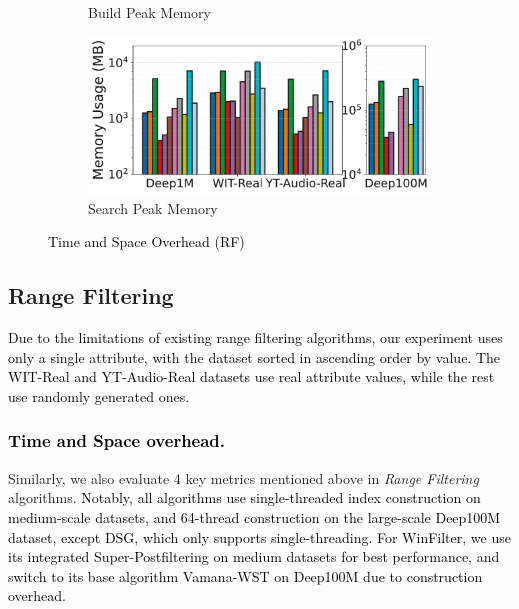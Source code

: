 \documentclass[sigconf, nonacm, pdfa]{acmart}
\begin{document}
{\begin{figure}[t]
\begin{subfigure}[t]{0.495\columnwidth}
			\caption{\footnotesize Build Peak Memory}
			\label{fig:rangeFilter_build_memory_mb}
		\end{subfigure}
		\hfill
		\begin{subfigure}[t]{0.495\columnwidth}
			\centering
			\includegraphics[width=\linewidth]{figures/searchMem/range_memory_comparison.pdf}
			\caption{\footnotesize Search Peak Memory}
			\label{fig:rangeFilter_search_memory_mb}
		\end{subfigure}
		
		\setlength{\abovecaptionskip}{0.1cm}
		\setlength{\belowcaptionskip}{-0.3cm}
		\caption{\textcolor{black}{Time and Space Overhead (RF)}}
		\label{fig:rangeFilter_build_index_comparison}
	\end{figure}
	\subsection{Range Filtering}
	\textcolor{black}{Due to the limitations of existing range filtering algorithms, our experiment uses only a single attribute, with the dataset sorted in ascending order by value. The WIT-Real and YT-Audio-Real datasets use real attribute values, while the rest use randomly generated ones. }
	\subsubsection{\textcolor{black}{Time and Space overhead.}}
	
	Similarly, we also evaluate \textcolor{black}{4} key metrics mentioned above in \textit{Range Filtering} algorithms. \textcolor{black}{Notably, all algorithms use single-threaded index construction on medium-scale datasets, and 64-thread construction on the large-scale Deep100M dataset, except DSG, which only supports single-threading. For WinFilter, we use its integrated Super-Postfiltering on medium datasets for best performance, and switch to its base algorithm Vamana-WST on Deep100M due to construction overhead.
	}
	
}
\end{document}
